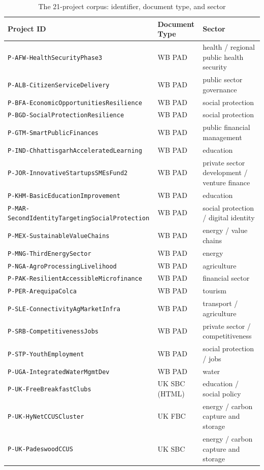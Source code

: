 \documentclass[conference]{IEEEtran}
\begin{document}
\begin{table}[t]
\centering
\caption{The 21-project corpus: identifier, document type, and sector}
\label{tab:corpus}
\begin{tabular}{@{}lll@{}}
\toprule
\textbf{Project ID} & \textbf{Document Type} & \textbf{Sector} \\
\midrule
\texttt{P-AFW-HealthSecurityPhase3} & WB PAD & health / regional public health security \\
\texttt{P-ALB-CitizenServiceDelivery} & WB PAD & public sector governance \\
\texttt{P-BFA-EconomicOpportunitiesResilience} & WB PAD & social protection \\
\texttt{P-BGD-SocialProtectionResilience} & WB PAD & social protection \\
\texttt{P-GTM-SmartPublicFinances} & WB PAD & public financial management \\
\texttt{P-IND-ChhattisgarhAcceleratedLearning} & WB PAD & education \\
\texttt{P-JOR-InnovativeStartupsSMEsFund2} & WB PAD & private sector development / venture finance \\
\texttt{P-KHM-BasicEducationImprovement} & WB PAD & education \\
\texttt{P-MAR-SecondIdentityTargetingSocialProtection} & WB PAD & social protection / digital identity \\
\texttt{P-MEX-SustainableValueChains} & WB PAD & energy / value chains \\
\texttt{P-MNG-ThirdEnergySector} & WB PAD & energy \\
\texttt{P-NGA-AgroProcessingLivelihood} & WB PAD & agriculture \\
\texttt{P-PAK-ResilientAccessibleMicrofinance} & WB PAD & financial sector \\
\texttt{P-PER-ArequipaColca} & WB PAD & tourism \\
\texttt{P-SLE-ConnectivityAgMarketInfra} & WB PAD & transport / agriculture \\
\texttt{P-SRB-CompetitivenessJobs} & WB PAD & private sector / competitiveness \\
\texttt{P-STP-YouthEmployment} & WB PAD & social protection / jobs \\
\texttt{P-UGA-IntegratedWaterMgmtDev} & WB PAD & water \\
\texttt{P-UK-FreeBreakfastClubs} & UK SBC (HTML) & education / social policy \\
\texttt{P-UK-HyNetCCUSCluster} & UK FBC & energy / carbon capture and storage \\
\texttt{P-UK-PadeswoodCCUS} & UK SBC & energy / carbon capture and storage \\
\bottomrule
\end{tabular}
\end{table}
\end{document}
